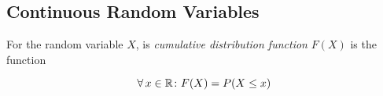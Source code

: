 \subsection{Continuous Random Variables}

\begin{definition}
    For the random variable $X$, is \textit{cumulative distribution function}
    $F(X)$ is the function

    \begin{equation}
        \operatorname{\forall} x \in \mathbb{R} \colon F(X) = P(X \le x)
    \end{equation}
\end{definition}

